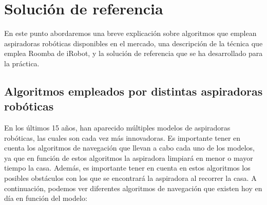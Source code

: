\section{Solución de referencia}
En este punto abordaremos una breve explicación sobre algoritmos que emplean aspiradoras robóticas disponibles en el mercado, una descripción de la técnica que emplea Roomba de iRobot, y la solución de referencia que se ha desarrollado para la práctica. 


\subsection{Algoritmos empleados por distintas aspiradoras robóticas}
En los últimos 15 años, han aparecido múltiples modelos de aspiradoras robóticas, las cuales son cada vez más innovadoras. Es importante tener en cuenta los algoritmos de navegación que llevan a cabo cada uno de los modelos, ya que en función de estos algoritmos la aspiradora limpiará en menor o mayor tiempo la casa. Además, es importante tener en cuenta en estos algoritmos los posibles obstáculos con los que se encontrará la aspiradora al recorrer la casa. A continuación, podemos ver diferentes algoritmos de navegación que existen hoy en día en función del modelo:

